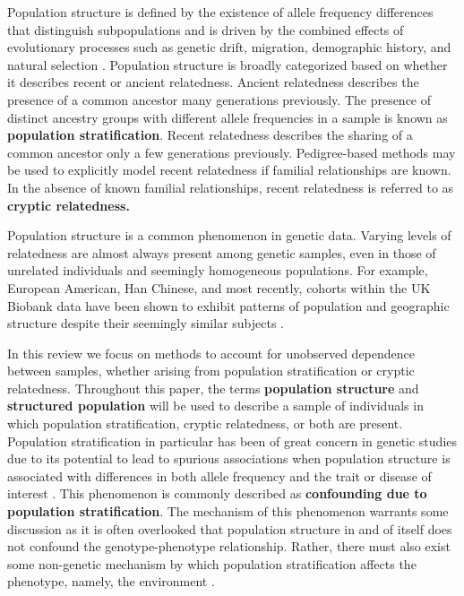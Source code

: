 Population structure is defined by the existence of allele frequency differences that distinguish subpopulations and is driven by the combined effects of evolutionary processes such as genetic drift, migration, demographic history, and natural selection \citep{gibson2015primer, tibayrenc2017genetics}. Population structure is broadly categorized based on whether it describes recent or ancient relatedness. Ancient relatedness describes the presence of a common ancestor many generations previously. The presence of distinct ancestry groups with different allele frequencies in a sample is known as \textbf{population stratification}. Recent relatedness describes the sharing of a common ancestor only a few generations previously. Pedigree-based methods may be used to explicitly model recent relatedness if familial relationships are known. In the absence of known familial relationships, recent relatedness is referred to as \textbf{cryptic relatedness.} 

Population structure is a common phenomenon in genetic data. Varying levels of relatedness are almost always present among genetic samples, even in those of unrelated individuals and seemingly homogeneous populations. For example, European American, Han Chinese, and most recently, cohorts within the UK Biobank data have been shown to exhibit patterns of population and geographic structure despite their seemingly similar subjects \citep{campbell2005demonstrating, xu2009genomic, chen2009genetic, haworth2019apparent}.

In this review we focus on methods to account for unobserved dependence between samples, whether arising from population stratification or cryptic relatedness. Throughout this paper, the terms \textbf{population structure} and \textbf{structured population} will be used to describe a sample of individuals in which population stratification, cryptic relatedness, or both are present. Population stratification in particular has been of great concern in genetic studies due to its potential to lead to spurious associations when population structure is associated with differences in both allele frequency and the trait or disease of interest \citep{gibson2015primer}. This phenomenon is commonly described as \textbf{confounding due to population stratification}. The mechanism of this phenomenon warrants some discussion as it is often overlooked that population structure in and of itself does not confound the genotype-phenotype relationship. Rather, there must also exist some non-genetic mechanism by which population stratification affects the phenotype, namely, the environment \citep{barton2019population, vilhjalmsson2012nature}.


